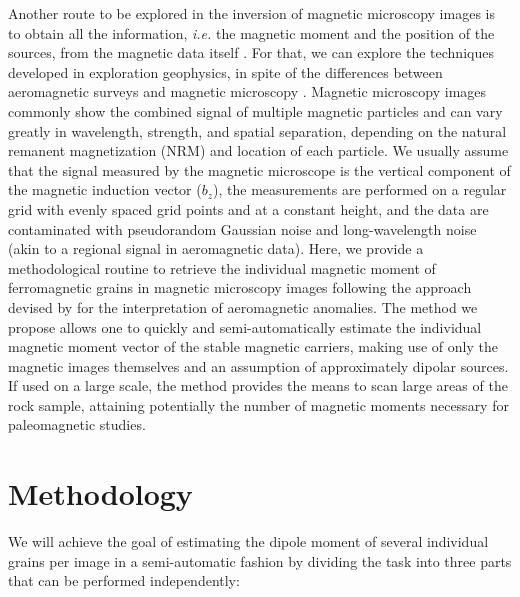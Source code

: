 Another route to be explored in the inversion of magnetic microscopy images is
to obtain all the information, \textit{i.e.} the magnetic moment and the position of the
sources, from the magnetic data itself \citep[\textit{e.g.}, ][]{Fu2020}. For that, we can
explore the techniques developed in exploration geophysics, in spite of the
differences between aeromagnetic surveys and magnetic microscopy
\citep{Lima2013}. Magnetic microscopy images commonly show the combined signal
of multiple magnetic particles and can vary greatly in wavelength, strength,
and spatial separation, depending on the natural remanent magnetization (NRM) and location of each particle. We
usually assume that the signal measured by the magnetic microscope is the
vertical component of the magnetic induction vector ($b_z$), the measurements
are performed on a regular grid with evenly spaced grid points and at a
constant height, and the data are contaminated with pseudorandom Gaussian noise and
long-wavelength noise (akin to a regional signal in aeromagnetic data). Here,
we provide a methodological routine to retrieve the individual magnetic moment
of ferromagnetic grains in magnetic microscopy images following the approach
devised by \citet{Oliveira2015Estimation} for the interpretation of
aeromagnetic anomalies. The method we propose allows one to quickly and
semi-automatically estimate the individual magnetic moment vector of the stable
magnetic carriers, making use of only the magnetic images themselves and an
assumption of approximately dipolar sources. If used on a large scale, the
method provides the means to scan large areas of the rock sample, attaining
potentially the number of magnetic moments necessary for paleomagnetic studies.


\section{Methodology}

We will achieve the goal of estimating the dipole moment of several individual
grains per image in a semi-automatic fashion by dividing the task into three
parts that can be performed independently:

